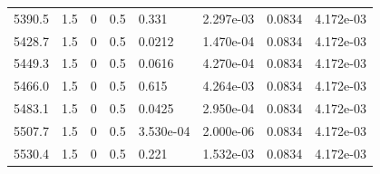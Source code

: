 \documentclass[preview]{standalone}
\begin{document}
{{{{{\begin{tabular}{L{1.2cm}C{1.2cm} C{0.3cm}C{0.5cm} C{1.4cm}C{1.4cm} C{1.4cm}C{1.4cm}}
  5390.5  &   1.5  & 0     & 0.5 &  0.331  & 2.297e-03  & 0.0834 &  4.172e-03   \\ 
  5428.7  &   1.5  & 0     & 0.5 &  0.0212  & 1.470e-04  & 0.0834 &  4.172e-03   \\ 
  5449.3  &   1.5  & 0     & 0.5 &  0.0616  & 4.270e-04  & 0.0834 &  4.172e-03   \\ 
  5466.0  &   1.5  & 0     & 0.5 &  0.615  & 4.264e-03  & 0.0834 &  4.172e-03   \\ 
  5483.1  &   1.5  & 0     & 0.5 &  0.0425  & 2.950e-04  & 0.0834 &  4.172e-03   \\ 
  5507.7  &   1.5  & 0     & 0.5 &  3.530e-04  & 2.000e-06  & 0.0834 &  4.172e-03   \\ 
  5530.4  &   1.5  & 0     & 0.5 &  0.221  & 1.532e-03  & 0.0834 &  4.172e-03   \\ 
\hline 
\end{tabular} 

}}}}}
\end{document}
